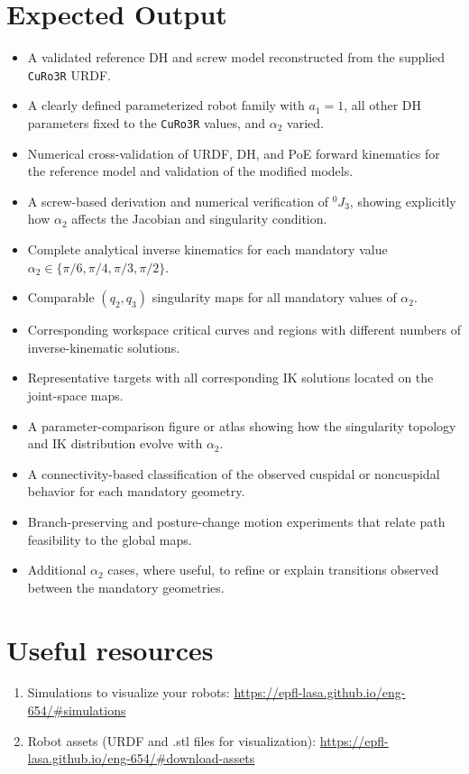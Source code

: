 \documentclass[11pt,a4paper]{article}
\begin{document}
\section*{Expected Output}
\begin{itemize}
  \item A validated reference DH and screw model reconstructed from the supplied \texttt{CuRo3R} URDF.
  \item A clearly defined parameterized robot family with $a_1=1$, all other DH parameters fixed to the \texttt{CuRo3R} values, and $\alpha_2$ varied.
  \item Numerical cross-validation of URDF, DH, and PoE forward kinematics for the reference model and validation of the modified models.
  \item A screw-based derivation and numerical verification of $^{0}J_3$, showing explicitly how $\alpha_2$ affects the Jacobian and singularity condition.
  \item Complete analytical inverse kinematics for each mandatory value $\alpha_2\in\{\pi/6,\pi/4,\pi/3,\pi/2\}$.
  \item Comparable $(q_2,q_3)$ singularity maps for all mandatory values of $\alpha_2$.
  \item Corresponding workspace critical curves and regions with different numbers of inverse-kinematic solutions.
  \item Representative targets with all corresponding IK solutions located on the joint-space maps.
  \item A parameter-comparison figure or atlas showing how the singularity topology and IK distribution evolve with $\alpha_2$.
  \item A connectivity-based classification of the observed cuspidal or noncuspidal behavior for each mandatory geometry.
  \item Branch-preserving and posture-change motion experiments that relate path feasibility to the global maps.
  \item Additional $\alpha_2$ cases, where useful, to refine or explain transitions observed between the mandatory geometries.
\end{itemize}

\section*{Useful resources}
\begin{enumerate}
	\item Simulations to visualize your robots: \url{https://epfl-lasa.github.io/eng-654/#simulations} 
	\item Robot assets (URDF and .stl files for visualization): \url{https://epfl-lasa.github.io/eng-654/#download-assets}
\end{enumerate}
\end{document}
